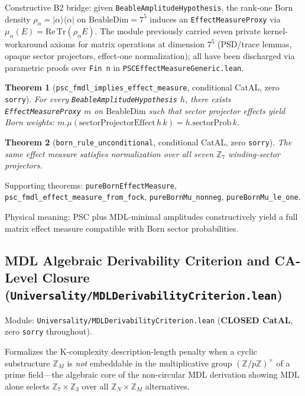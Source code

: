 \documentclass[11pt,a4paper]{article}
\newtheorem{theorem}{Theorem}[section]
\theoremstyle{definition}
\begin{document}
Constructive B2 bridge: given \lstinline|BeableAmplitudeHypothesis|, the
rank-one Born density $\rho_\alpha = |\alpha\rangle\langle\alpha|$ on
$\mathrm{BeableDim} = 7^5$ induces an \lstinline|EffectMeasureProxy| via
$\mu_\alpha(E) = \mathrm{Re}\,\mathrm{Tr}(\rho_\alpha E)$.
The module previously carried seven private kernel-workaround axioms for matrix
operations at dimension $7^5$ (PSD/trace lemmas, opaque sector projectors,
effect-one normalization); all have been discharged via parametric proofs over
\texttt{Fin n} in \texttt{PSCEffectMeasureGeneric.lean}.

\begin{theorem}[\lstinline|psc_fmdl_implies_effect_measure|, conditional CatAL, zero \texttt{sorry}]
For every \lstinline|BeableAmplitudeHypothesis| $h$, there exists
\lstinline|EffectMeasureProxy| $m$ on $\mathrm{BeableDim}$ such that sector
projector effects yield Born weights:
$m.\mu(\mathrm{sectorProjectorEffect}\,h\,k) = h.\mathrm{sectorProb}\,k$.
\end{theorem}

\begin{theorem}[\lstinline|born_rule_unconditional|, conditional CatAL, zero \texttt{sorry}]
The same effect measure satisfies normalization over all seven
$\mathbb{Z}_7$ winding-sector projectors.
\end{theorem}

Supporting theorems: \lstinline|pureBornEffectMeasure|,
\lstinline|psc_fmdl_effect_measure_from_fock|,
\lstinline|pureBornMu_nonneg|, \lstinline|pureBornMu_le_one|.

Physical meaning: PSC plus MDL-minimal amplitudes constructively yield a
full matrix effect measure compatible with Born sector probabilities.

\subsection{MDL Algebraic Derivability Criterion and CA-Level Closure
  (\texttt{Universality/MDLDerivabilityCriterion.lean})}\label{subsec:mdl-derivability}

Module: \texttt{Universality/MDLDerivabilityCriterion.lean}
(\textbf{CLOSED CatAL}, zero \lstinline|sorry| throughout).

Formalizes the K-complexity description-length penalty when a cyclic substructure
$\mathbb{Z}_M$ is \emph{not} embeddable in the multiplicative group
$(\mathbb{Z}/p\mathbb{Z})^\times$ of a prime field---the algebraic core of the
non-circular MDL derivation showing MDL alone selects $\mathbb{Z}_7\times\mathbb{Z}_3$
over all $\mathbb{Z}_N\times\mathbb{Z}_M$ alternatives.
\end{document}
